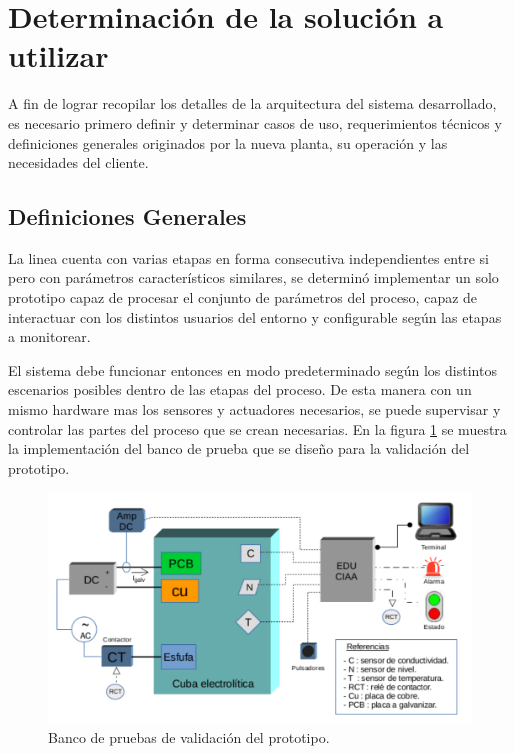 \section{ Determinación de la solución a utilizar } 

A fin de lograr recopilar los detalles de la arquitectura del sistema desarrollado, es necesario primero definir y determinar casos de uso, requerimientos técnicos y definiciones generales originados por la nueva planta, su operación y las necesidades del cliente. 

\subsection{ Definiciones Generales }

La linea cuenta con varias etapas en forma consecutiva independientes entre si pero con parámetros característicos similares, se determinó implementar un solo prototipo capaz de procesar el conjunto de parámetros del proceso, capaz de interactuar con los distintos usuarios del entorno y configurable según las etapas a monitorear.

El sistema debe funcionar entonces en modo predeterminado según los distintos escenarios posibles dentro de las etapas del proceso. De esta manera con un mismo hardware mas los sensores y actuadores necesarios, se puede supervisar y controlar las partes del proceso que se crean necesarias. En la figura \ref{fig:banco_pruebas} se muestra la implementación del banco de prueba que se diseño para la validación del prototipo.

\begin{figure}[h!]
	\hspace{-0.5cm}
	\includegraphics[width=1.2\textwidth]{Figures/Cap_2/diagrama_prototipo}
	\caption{Banco de pruebas de validación del prototipo. }
	\label{fig:banco_pruebas}
\end{figure}

